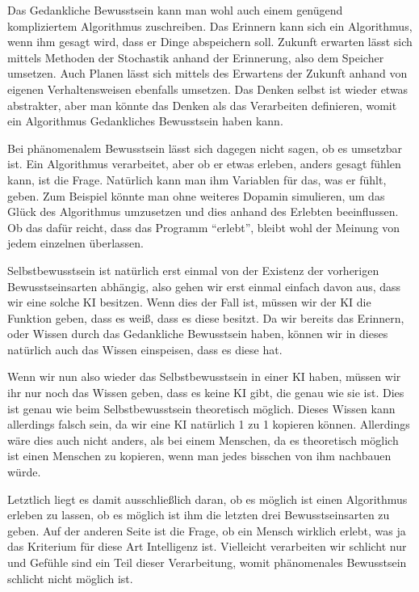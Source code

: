 Das Gedankliche Bewusstsein kann man wohl auch einem genügend kompliziertem Algorithmus zuschreiben.
Das Erinnern kann sich ein Algorithmus, wenn ihm gesagt wird, dass er Dinge abspeichern soll.
Zukunft erwarten lässt sich mittels Methoden der Stochastik anhand der Erinnerung, also dem Speicher umsetzen.
Auch Planen lässt sich mittels des Erwartens der Zukunft anhand von eigenen Verhaltensweisen ebenfalls umsetzen.
Das Denken selbst ist wieder etwas abstrakter, aber man könnte das Denken als das Verarbeiten definieren, womit ein Algorithmus Gedankliches Bewusstsein haben kann.

Bei phänomenalem Bewusstsein lässt sich dagegen nicht sagen, ob es umsetzbar ist.
Ein Algorithmus verarbeitet, aber ob er etwas erleben, anders gesagt fühlen kann, ist die Frage.
Natürlich kann man ihm Variablen für das, was er fühlt, geben.
Zum Beispiel könnte man ohne weiteres Dopamin simulieren, um das Glück des Algorithmus umzusetzen und dies anhand des Erlebten beeinflussen.
Ob das dafür reicht, dass das Programm "`erlebt"', bleibt wohl der Meinung von jedem einzelnen überlassen.


Selbstbewusstsein ist natürlich erst einmal von der Existenz der vorherigen Bewusstseinsarten abhängig, also gehen wir erst einmal einfach davon aus, dass wir eine solche KI besitzen.
Wenn dies der Fall ist, müssen wir der KI die Funktion geben, dass es weiß, dass es diese besitzt.
Da wir bereits das Erinnern, oder Wissen durch das Gedankliche Bewusstsein haben, können wir in dieses natürlich auch das Wissen einspeisen, dass es diese hat.

Wenn wir nun also wieder das Selbstbewusstsein in einer KI haben, müssen wir ihr nur noch das Wissen geben, dass es keine KI gibt, die genau wie sie ist.
Dies ist genau wie beim Selbstbewusstsein theoretisch möglich.
Dieses Wissen kann allerdings falsch sein, da wir eine KI natürlich 1 zu 1 kopieren können.
Allerdings wäre dies auch nicht anders, als bei einem Menschen, da es theoretisch möglich ist einen Menschen zu kopieren, wenn man jedes bisschen von ihm nachbauen würde.

Letztlich liegt es damit ausschließlich daran, ob es möglich ist einen Algorithmus erleben zu lassen, ob es möglich ist ihm die letzten drei Bewusstseinsarten zu geben.
Auf der anderen Seite ist die Frage, ob ein Mensch wirklich erlebt, was ja das Kriterium für diese Art Intelligenz ist.
Vielleicht verarbeiten wir schlicht nur und Gefühle sind ein Teil dieser Verarbeitung, womit phänomenales Bewusstsein schlicht nicht möglich ist.


